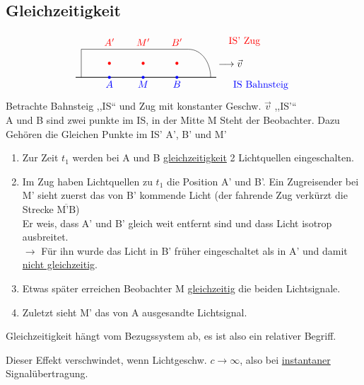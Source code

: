 \documentclass[titlepage,12pt,a4paper,ngerman]{report}
\newcommand{\tx}[1]{\textrm{#1}}
\newcommand{\rbox}[1]{\begin{tcolorbox}[colback=white,colframe=red!75!black]#1\end{tcolorbox}} %
\begin{document}
{\subsection{Gleichzeitigkeit}
$$
\begin{tikzpicture}
\draw[thick] (0,0) -- (5,0);
\draw (0.2,0) -- (0.2,1);
\draw (0.2,1) -- (4,1);
\draw[-] (4,1) to [out=0,in=90] (4.8,0);
\draw[red,text=red] (1.2,1) node[above]{$A'$};
\fill[red] (1.2,0.5)  circle[radius=1.5pt];
\draw[red,text=red] (2.4,1) node[above]{$M'$};
\fill[red] (2.4,0.5)  circle[radius=1.5pt];
\draw[red,text=red] (3.6,1) node[above]{$B'$};
\fill[red] (3.6,0.5)  circle[radius=1.5pt];
\draw[red,text=red] (6,1) node[above]{IS' Zug};
\draw[blue,text=blue] (1.2,0) node[below]{$A$};
\fill[blue] (1.2,0)  circle[radius=1.5pt];
\draw[blue,text=blue] (2.4,0) node[below]{$M$};
\fill[blue] (2.4,0)  circle[radius=1.5pt];
\draw[blue,text=blue] (3.6,0) node[below]{$B$};
\fill[blue] (3.6,0)  circle[radius=1.5pt];
\draw[blue,text=blue] (6.58,0) node[below]{IS Bahnsteig};
\node at (5.5,0.5) [align=flush center,text width=3cm]
{$\longrightarrow \vec{v}$};
\end{tikzpicture}$$
Betrachte Bahnsteig ,,IS`` und Zug mit konstanter Geschw. $ \vec{v} $ ,,IS'``\\
A und B sind zwei punkte im IS, in der Mitte M Steht der Beobachter. Dazu Gehören die Gleichen Punkte im IS' A', B' und M'
\begin{enumerate}[1.)]
	\item Zur Zeit $ t_1 $ werden bei A und B \underline{gleichzeitigkeit} 2 Lichtquellen eingeschalten.
	\item Im Zug haben Lichtquellen zu $ t_1 $ die Position A' und B'. Ein Zugreisender bei M' sieht zuerst das von B' kommende Licht (der fahrende Zug verkürzt die Strecke $ \overline{\tx{M'B}} $) \\
	Er weis, dass A' und B' gleich weit entfernt sind und dass Licht isotrop ausbreitet.\\
	$ \rightarrow $ Für ihn wurde das Licht in B' früher eingeschaltet als in A' und damit \underline{nicht gleichzeitig}.
	\item Etwas später erreichen Beobachter M \underline{gleichzeitig} die beiden Lichtsignale.
	\item Zuletzt sieht M' das von A ausgesandte Lichtsignal.
\end{enumerate}
\rbox{Gleichzeitigkeit hängt vom Bezugssystem ab, es ist also ein relativer Begriff.}
Dieser Effekt verschwindet, wenn Lichtgeschw. $ c \rightarrow \infty $, also bei \underline{instantaner} Signalübertragung.

}
\end{document}
